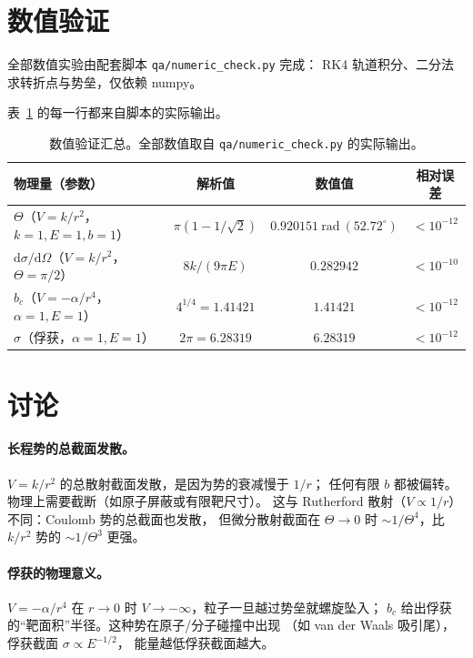 \documentclass[UTF8,a4paper,11pt]{ctexart}
\begin{document}
\section{数值验证}
\label{sec:numeric}

全部数值实验由配套脚本 \texttt{qa/numeric\_check.py} 完成：
RK4 轨道积分、二分法求转折点与势垒，仅依赖 numpy。

表~\ref{tab:numeric} 的每一行都来自脚本的实际输出。

\begin{table}[htbp]
\centering
\small
\begin{tabular}{p{5.5cm}ccc}
\toprule
物理量（参数） & 解析值 & 数值值 & 相对误差 \\
\midrule
$\Theta$（$V=k/r^2$，$k=1,E=1,b=1$） & $\pi(1-1/\sqrt2)$ & $0.920151\ \mathrm{rad}\ (52.72^\circ)$ & $<10^{-12}$ \\
$\mathrm d\sigma/\mathrm d\Omega$（$V=k/r^2$，$\Theta=\pi/2$） & $8k/(9\pi E)$ & $0.282942$ & $<10^{-10}$ \\
$b_c$（$V=-\alpha/r^4$，$\alpha=1,E=1$） & $4^{1/4}=1.41421$ & $1.41421$ & $<10^{-12}$ \\
$\sigma$（俘获，$\alpha=1,E=1$） & $2\pi=6.28319$ & $6.28319$ & $<10^{-12}$ \\\bottomrule
\end{tabular}
\caption{数值验证汇总。全部数值取自 \texttt{qa/numeric\_check.py} 的实际输出。}
\label{tab:numeric}
\end{table}

\section{讨论}
\label{sec:discuss}

\paragraph{长程势的总截面发散。}
$V=k/r^2$ 的总散射截面发散，是因为势的衰减慢于 $1/r$；
任何有限 $b$ 都被偏转。物理上需要截断（如原子屏蔽或有限靶尺寸）。
这与 Rutherford 散射（$V\propto 1/r$）不同：Coulomb 势的总截面也发散，
但微分散射截面在 $\Theta\to0$ 时 $\sim 1/\Theta^4$，比 $k/r^2$ 势的
$\sim 1/\Theta^3$ 更强。

\paragraph{俘获的物理意义。}
$V=-\alpha/r^4$ 在 $r\to0$ 时 $V\to-\infty$，粒子一旦越过势垒就螺旋坠入；
$b_c$ 给出俘获的``靶面积''半径。这种势在原子/分子碰撞中出现
（如 van der Waals 吸引尾），俘获截面 $\sigma\propto E^{-1/2}$，
能量越低俘获截面越大。
\end{document}
